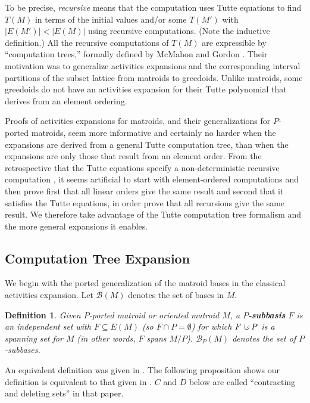 \documentclass[12pt,leqno]{amsart}
\newtheorem{definition}[lem]{Definition}
\theoremstyle{remark}
\newcommand{\dunion}
{\mbox{\hbox{\hskip6pt$\cdot$\hskip-5.50pt$\cup$\hskip2pt}}}
\begin{document}
To be precise, \emph{recursive}
means that the computation uses Tutte equations
to find $T(M)$ in terms of the initial values
and/or  some $T(M')$ with $|E(M')|<|E(M)|$
using recursive computations.  (Note the inductive
definition.)
All the recursive computations of $T(M)$ 
are expressible by ``computation trees,''
formally defined by McMahon and Gordon 
\cite{GordonMcMachonGreedoid}.
Their motivation was to generalize activities expansions and
the corresponding interval partitions of the subset lattice from
matroids to greedoids.  Unlike matroids, some greedoids
do not have an activities expansion for their Tutte polynomial
that derives from an element ordering.

Proofs of activities expansions for matroids, and their generalizations
for $P$-ported matroids, seem more informative and certainly
no harder when the expansions are derived from a general Tutte
computation tree, than when the expansions are only those
that result from an element order.   
From the retrospective that the Tutte equations
specify a non-deterministic recursive computation
\cite{Garey-Johnson}, it seems artificial to start with
element-ordered computations and then prove
first that all linear orders give the same result and 
second that it 
satisfies the Tutte equations, in order prove that 
all recursions give the same result.
We therefore
take advantage of the Tutte computation tree formalism
and the more general expansions it enables.


\subsection{Computation Tree Expansion}

We begin with the ported generalization
of the matroid bases in the classical activities expansion.
Let $\mathcal{B}(M)$ denotes the set of bases in $M$.

\begin{definition}
Given $P$-ported matroid or oriented matroid $M$,
a \textbf{$P$-subbasis} $F$
is an independent set  with $F\subseteq E(M)$
(so $F\cap P=\emptyset$) for which $F\dunion P$ is a spanning set
for $M$
(in other words, $F$ spans $M/P$).
$\mathcal{B}_P(M)$ denotes the set of $P$-subbases.
\end{definition}

An equivalent definition was given in \cite{SetPointedLV}.
The following proposition shows our definition is equivalent to
that given in \cite{RelTuttePoly}.  $C$ and $D$ below are called 
``contracting and deleting sets'' in that paper.
\end{document}
